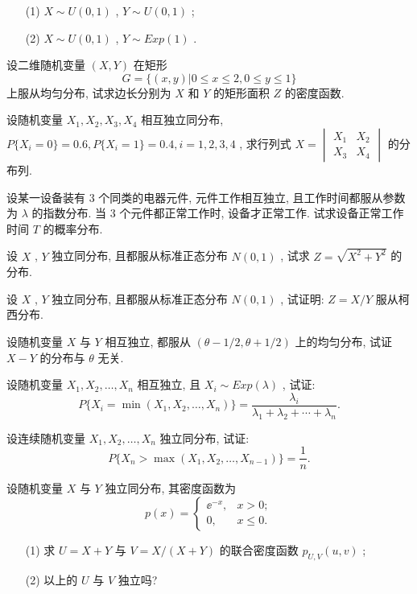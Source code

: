 \begin{xiti}
      \begin{enumerate}
      	\item[(1)] $X\sim U(0,1)$ , $Y\sim U(0,1)$ ;
      	\item[(2)] $X\sim U(0,1)$ , $Y\sim Exp(1)$ .
      \end{enumerate}
      \item 设二维随机变量 $(X,Y)$ 在矩形
      \begin{equation*}
      	G=\{(x,y)|0\leqslant x\leqslant2,0\leqslant y\leqslant1\}
      \end{equation*}
      上服从均匀分布, 试求边长分别为 $X$ 和 $Y$ 的矩形面积 $Z$ 的密度函数.
      \item 设随机变量 $X_1,X_2,X_3,X_4$ 相互独立同分布, $P\{X_i=0\}=0.6,P\{X_i=1\}=0.4,i=1,2,3,4$ , 求行列式 $X=\begin{vmatrix}
      X_1 & X_2\\
      X_3 & X_4
      \end{vmatrix}$ 的分布列.
      \item 设某一设备装有 $3$ 个同类的电器元件, 元件工作相互独立, 且工作时间都服从参数为 $\lambda$ 的指数分布. 当 $3$ 个元件都正常工作时, 设备才正常工作. 试求设备正常工作时间 $T$ 的概率分布.
      \item 设 $X$ , $Y$ 独立同分布, 且都服从标准正态分布 $N(0,1)$ , 试求 $Z=\sqrt{X^2+Y^2}$ 的分布.
      \item 设 $X$ , $Y$ 独立同分布, 且都服从标准正态分布 $N(0,1)$ , 试证明: $Z=X/Y$ 服从柯西分布.
      \item 设随机变量 $X$ 与 $Y$ 相互独立, 都服从 $(\theta-1/2,\theta+1/2)$ 上的均匀分布, 试证 $X-Y$ 的分布与 $\theta$ 无关.
      \item 设随机变量 $X_1,X_2,\ldots,X_n$ 相互独立, 且 $X_{i}\sim Exp(\lambda)$ , 试证:
      \begin{equation*}
      	P\{X_{i}=\min(X_1,X_2,\ldots,X_n)\}=\frac{\lambda_{i}}{\lambda_{1}+\lambda_{2}+\cdots+\lambda_{n}}.
      \end{equation*}
      \item 设连续随机变量 $X_1,X_2,\ldots,X_n$ 独立同分布, 试证:
      \begin{equation*}
      	P\{X_n>\max(X_1,X_2,\ldots,X_{n-1})\}=\frac{1}{n}.
      \end{equation*}
      \item 设随机变量 $X$ 与 $Y$ 独立同分布, 其密度函数为
      \begin{equation*}
      	p(x)=\begin{cases}
      	\ee^{-x}, & x>0;\\
      	0, & x\leqslant0.
      	\end{cases}
      \end{equation*}
      \begin{enumerate}
      	\item[(1)] 求 $U=X+Y$ 与 $V=X/(X+Y)$ 的联合密度函数 $p_{U,V}(u,v)$ ;
      	\item[(2)] 以上的 $U$ 与 $V$ 独立吗?
      \end{enumerate}
      \end{xiti}
